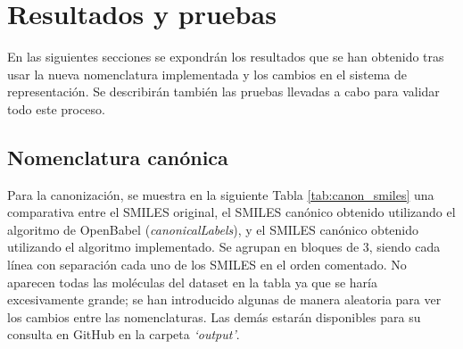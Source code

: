 
\chapter{Resultados y pruebas}

En las siguientes secciones se expondrán los resultados que se han obtenido tras usar la nueva nomenclatura implementada y los cambios en el sistema de representación. Se describirán también las pruebas llevadas a cabo para validar todo este proceso.

\section{Nomenclatura canónica}

Para la canonización, se muestra en la siguiente Tabla \ref{tab:canon_smiles} una comparativa entre el SMILES original, el SMILES canónico obtenido utilizando el algoritmo de OpenBabel (\textit{canonicalLabels}), y el SMILES canónico obtenido utilizando el algoritmo implementado. Se agrupan en bloques de 3, siendo cada línea con separación cada uno de los SMILES en el orden comentado. No aparecen todas las moléculas del dataset en la tabla ya que se haría excesivamente grande; se han introducido algunas de manera aleatoria para ver los cambios entre las nomenclaturas. Las demás estarán disponibles para su consulta en GitHub en la carpeta \textit{`output'}.

